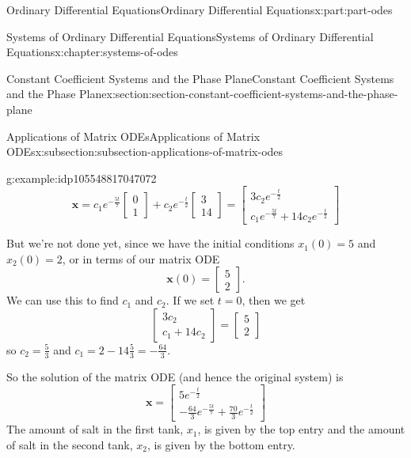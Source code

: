\documentclass[twoside,10pt,]{book}
\numberwithin{equation}{part}
\renewcommand{\vec}[1]{\mathbf{#1}}
\begin{document}
\begin{partptx}{Ordinary Differential Equations}{}{Ordinary Differential Equations}{}{}{x:part:part-odes}
\begin{chapterptx}{Systems of Ordinary Differential Equations}{}{Systems of Ordinary Differential Equations}{}{}{x:chapter:systems-of-odes}
\begin{sectionptx}{Constant Coefficient Systems and the Phase Plane}{}{Constant Coefficient Systems and the Phase Plane}{}{}{x:section:section-constant-coefficient-systems-and-the-phase-plane}
\begin{subsectionptx}{Applications of Matrix ODEs}{}{Applications of Matrix ODEs}{}{}{x:subsection:subsection-applications-of-matrix-odes}
\begin{example}{}{g:example:idp105548817047072}
\begin{equation*}
\vec{x} = c_{1}e^{-\frac{5t}{7}}\begin{bmatrix}0\\1\end{bmatrix} + c_{2}e^{-\frac{t}{2}}\begin{bmatrix}3\\14\end{bmatrix} = \begin{bmatrix}3c_{2}e^{-\frac{t}{2}} \\ c_{1}e^{-\frac{5t}{7}}+14c_{2}e^{-\frac{t}{2}}\end{bmatrix}
\end{equation*}
%
\par
But we're not done yet, since we have the initial conditions \(x_{1}(0) = 5\) and \(x_{2}(0) = 2\), or in terms of our matrix ODE%
\begin{equation*}
\vec{x}(0) = \begin{bmatrix}5\\2\end{bmatrix}.
\end{equation*}
We can use this to find \(c_{1}\) and \(c_{2}\). If we set \(t=0\), then we get%
\begin{equation*}
\begin{bmatrix}3c_{2} \\ c_{1} + 14c_{2}\end{bmatrix} = \begin{bmatrix}5\\2\end{bmatrix}
\end{equation*}
so \(c_{2} = \frac{5}{3}\) and \(c_{1} = 2 - 14\frac{5}{3} = -\frac{64}{3}\).%
\par
So the solution of the matrix ODE (and hence the original system) is%
\begin{equation*}
\vec{x} = \begin{bmatrix}5e^{-\frac{t}{2}} \\ -\frac{64}{3}e^{-\frac{5t}{7}}+\frac{70}{3}e^{-\frac{t}{2}}\end{bmatrix}
\end{equation*}
The amount of salt in the first tank, \(x_{1}\), is given by the top entry and the amount of salt in the second tank, \(x_{2}\), is given by the bottom entry.%
\end{example}
\end{subsectionptx}
%
%
\typeout{************************************************}

\end{sectionptx}
\end{chapterptx}
\end{partptx}
\end{document}
